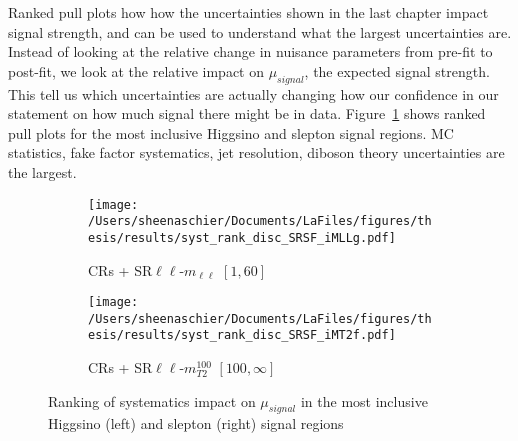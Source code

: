 Ranked pull plots how how the uncertainties shown in the last chapter impact signal strength, and can be used to understand what the largest uncertainties are.  Instead of looking at the relative change in nuisance parameters from pre-fit to post-fit, we look at the relative impact on $\mu_{signal}$, the expected signal strength.  This tell us which uncertainties are actually changing how our confidence in our statement on how much signal there might be in data.  Figure~\ref{fig:thy:pull} shows ranked pull plots for the most inclusive Higgsino and slepton signal regions.   MC statistics, fake factor systematics, jet resolution, diboson theory uncertainties are the largest. 
 \begin{figure}
  \centering
    \begin{subfigure}[b]{0.49\textwidth}
        \texttt{[image: /Users/sheenaschier/Documents/LaFiles/figures/thesis/results/syst\_rank\_disc\_SRSF\_iMLLg.pdf]}
    \caption{CRs + SR$\ell\ell$-$m_{\ell\ell}$ $[1,60]$}
    \end{subfigure}
    \begin{subfigure}[b]{0.49\textwidth}
        \texttt{[image: /Users/sheenaschier/Documents/LaFiles/figures/thesis/results/syst\_rank\_disc\_SRSF\_iMT2f.pdf]}
    \caption{CRs + SR$\ell\ell$-$m^{100}_{T2}$ $[100, \infty]$}
    \end{subfigure}
\caption{Ranking of systematics impact on $\mu_{signal}$ in the most inclusive Higgsino (left) and slepton (right) signal regions}
\label{fig:thy:pull}
 \end{figure}



